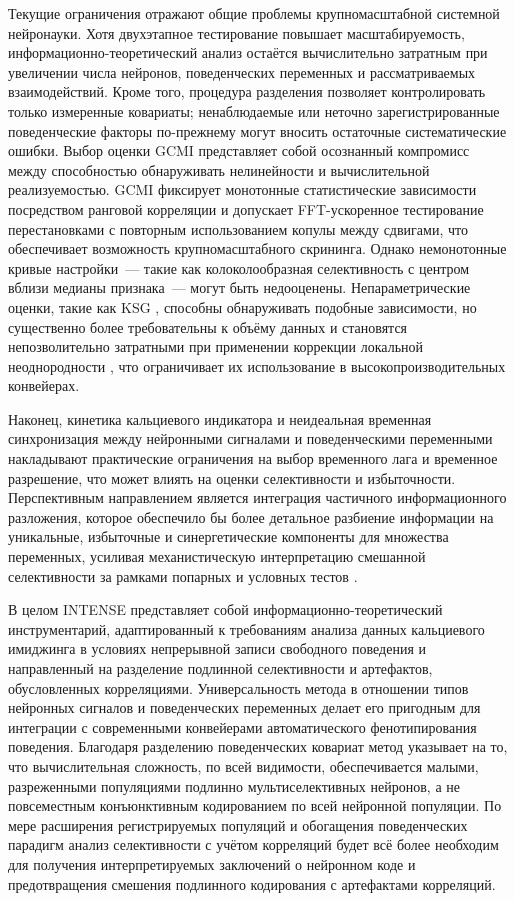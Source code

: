 Текущие ограничения отражают общие проблемы крупномасштабной системной нейронауки. Хотя двухэтапное тестирование повышает масштабируемость, информационно-теоретический анализ остаётся вычислительно затратным при увеличении числа нейронов, поведенческих переменных и рассматриваемых взаимодействий. Кроме того, процедура разделения позволяет контролировать только измеренные ковариаты; ненаблюдаемые или неточно зарегистрированные поведенческие факторы по-прежнему могут вносить остаточные систематические ошибки. Выбор оценки GCMI представляет собой осознанный компромисс между способностью обнаруживать нелинейности и вычислительной реализуемостью. GCMI фиксирует монотонные статистические зависимости посредством ранговой корреляции и допускает FFT-ускоренное тестирование перестановками с повторным использованием копулы между сдвигами, что обеспечивает возможность крупномасштабного скрининга. Однако немонотонные кривые настройки~--- такие как колоколообразная селективность с центром вблизи медианы признака~--- могут быть недооценены. Непараметрические оценки, такие как KSG \cite{Kraskov2004}, способны обнаруживать подобные зависимости, но существенно более требовательны к объёму данных и становятся непозволительно затратными при применении коррекции локальной неоднородности \cite{Gao2015LNC}, что ограничивает их использование в высокопроизводительных конвейерах.

Наконец, кинетика кальциевого индикатора и неидеальная временная синхронизация между нейронными сигналами и поведенческими переменными накладывают практические ограничения на выбор временного лага и временное разрешение, что может влиять на оценки селективности и избыточности. Перспективным направлением является интеграция частичного информационного разложения, которое обеспечило бы более детальное разбиение информации на уникальные, избыточные и синергетические компоненты для множества переменных, усиливая механистическую интерпретацию смешанной селективности за рамками попарных и условных тестов \cite{Williams2010}.

В целом INTENSE представляет собой информационно-теоретический инструментарий, адаптированный к требованиям анализа данных кальциевого имиджинга в условиях непрерывной записи свободного поведения и направленный на разделение подлинной селективности и артефактов, обусловленных корреляциями. Универсальность метода в отношении типов нейронных сигналов и поведенческих переменных делает его пригодным для интеграции с современными конвейерами автоматического фенотипирования поведения. Благодаря разделению поведенческих ковариат метод указывает на то, что вычислительная сложность, по всей видимости, обеспечивается малыми, разреженными популяциями подлинно мультиселективных нейронов, а не повсеместным конъюнктивным кодированием по всей нейронной популяции. По мере расширения регистрируемых популяций и обогащения поведенческих парадигм анализ селективности с учётом корреляций будет всё более необходим для получения интерпретируемых заключений о нейронном коде и предотвращения смешения подлинного кодирования с артефактами корреляций.
